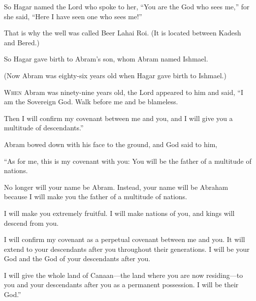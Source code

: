 \begin{scripture}
 So Hagar named the Lord who spoke to her, ``You are the God who sees me,'' for she said, ``Here I have seen one who sees me!''
 That is why the well was called Beer Lahai Roi. (It is located between Kadesh and Bered.)
\everypar{}

 So Hagar gave birth to Abram's son, whom Abram named Ishmael.
 (Now Abram was eighty-six years old when Hagar gave birth to Ishmael.)

 \allowchapbreak\hypertarget{ch-genesis-17}{}\lettrine[lines=5]{\color{pentateuch}W}{\textsc{hen}} Abram was ninety-nine years old, the Lord appeared to him and said, ``I am the Sovereign God. Walk before me and be blameless.\everypar{}
 Then I will confirm my covenant between me and you, and I will give you a multitude of descendants.''
\\\indent{} Abram bowed down with his face to the ground, and God said to him,
 ``As for me, this is my covenant with you: You will be the father of a multitude of nations.
 No longer will your name be Abram. Instead, your name will be Abraham because I will make you the father of a multitude of nations.
 I will make you extremely fruitful. I will make nations of you, and kings will descend from you.
 I will confirm my covenant as a perpetual covenant between me and you. It will extend to your descendants after you throughout their generations. I will be your God and the God of your descendants after you.
 I will give the whole land of Canaan---the land where you are now residing---to you and your descendants after you as a permanent possession. I will be their God.''
\everypar{}


\end{scripture}
